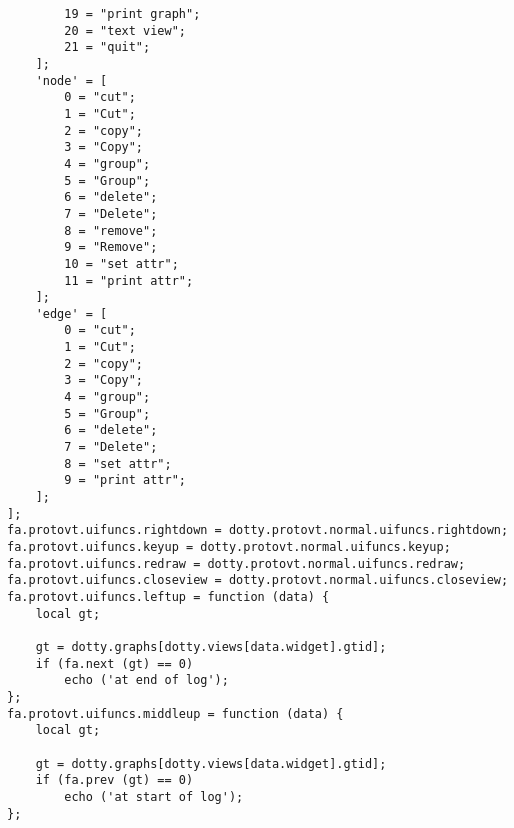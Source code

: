 \begin{verbatim}
        19 = "print graph";
        20 = "text view";
        21 = "quit";
    ];
    'node' = [
        0 = "cut";
        1 = "Cut";
        2 = "copy";
        3 = "Copy";
        4 = "group";
        5 = "Group";
        6 = "delete";
        7 = "Delete";
        8 = "remove";
        9 = "Remove";
        10 = "set attr";
        11 = "print attr";
    ];
    'edge' = [
        0 = "cut";
        1 = "Cut";
        2 = "copy";
        3 = "Copy";
        4 = "group";
        5 = "Group";
        6 = "delete";
        7 = "Delete";
        8 = "set attr";
        9 = "print attr";
    ];
];
fa.protovt.uifuncs.rightdown = dotty.protovt.normal.uifuncs.rightdown;
fa.protovt.uifuncs.keyup = dotty.protovt.normal.uifuncs.keyup;
fa.protovt.uifuncs.redraw = dotty.protovt.normal.uifuncs.redraw;
fa.protovt.uifuncs.closeview = dotty.protovt.normal.uifuncs.closeview;
fa.protovt.uifuncs.leftup = function (data) {
    local gt;

    gt = dotty.graphs[dotty.views[data.widget].gtid];
    if (fa.next (gt) == 0)
        echo ('at end of log');
};
fa.protovt.uifuncs.middleup = function (data) {
    local gt;

    gt = dotty.graphs[dotty.views[data.widget].gtid];
    if (fa.prev (gt) == 0)
        echo ('at start of log');
};
\end{verbatim}
